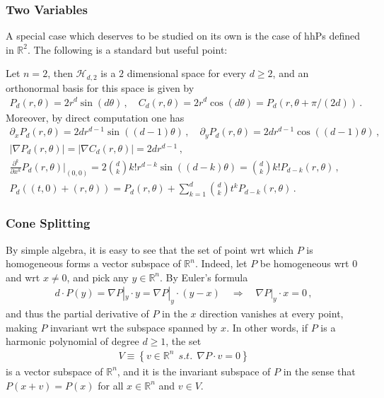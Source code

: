 \documentclass[11pt]{article}
\begin{document}
\subsubsection{Two Variables} A special case which deserves to be studied on its own is the case of hhPs defined in ${\mathbb{R}}^2$.  The following is a standard but useful point:
\begin{proposition}
 Let $n=2$, then ${\mathcal{H}}_{d,2}$ is a $2$ dimensional space for every $d\geq 2$, and an orthonormal basis for this space is given by
\begin{gather}
 P_d(r,\theta) = 2r^{d} \sin{\left({d\theta}\right)}\, , \quad C_d(r,\theta)= 2r^{d}\cos{\left({d\theta}\right)} = P_d(r,\theta+\pi/(2d))\, .
\end{gather}
Moreover, by direct computation one has
\begin{gather}\label{eq_dxP}
 \partial_x P_d(r,\theta) = 2d r^{d-1} \sin((d-1)\theta)\, , \quad \partial_y P_d(r,\theta) = 2d r^{d-1} \cos((d-1)\theta)\, ,\\
 {\left|{\nabla P_d(r,\theta)}\right|}={\left|{\nabla C_d(r,\theta)}\right|} = 2d r^{d-1}\, \label{eq_nabla2vars} ,\\
 \frac{\partial^k}{\partial x^k} P_d(r,\theta)|_{(0,0)} = 2 \binom{d}{k} k! r^{d-k}\sin((d-k)\theta)= \binom d k k! P_{d-k}(r,\theta)\, ,\\
  P_d((t,0)+(r,\theta)) = P_d(r,\theta) + \sum_{k=1}^d \binom{d}{k} t^k P_{d-k}(r,\theta)\, .
\end{gather}
\end{proposition}

\subsubsection{Cone Splitting}  By simple algebra, it is easy to see that the set of point wrt which $P$ is homogeneous forms a vector subspace of ${\mathbb{R}}^n$. Indeed, let $P$ be homogeneous wrt $0$ and wrt $x\neq 0$, and pick any $y\in {\mathbb{R}}^n$. By Euler's formula
\begin{gather}
 d\cdot P(y) = \nabla P|_y \cdot y = \nabla P|_y \cdot (y-x)\quad \Longrightarrow \quad \nabla P|_y \cdot x =0\, ,
\end{gather}
and thus the partial derivative of $P$ in the $x$ direction vanishes at every point, making $P$ invariant wrt the subspace spanned by $x$. In other words, if $P$ is a harmonic polynomial of degree $d\geq 1$, the set
\begin{gather}
 V\equiv{\left\{{v\in {\mathbb{R}}^n \ \ s.t.  \ \ \nabla P\cdot v =0}\right\}}
\end{gather}
is a vector subspace of ${\mathbb{R}}^n$, and it is the invariant subspace of $P$ in the sense that $P(x+v)=P(x)$ for all $x\in {\mathbb{R}}^n$ and $v\in V$. 
\end{document}
